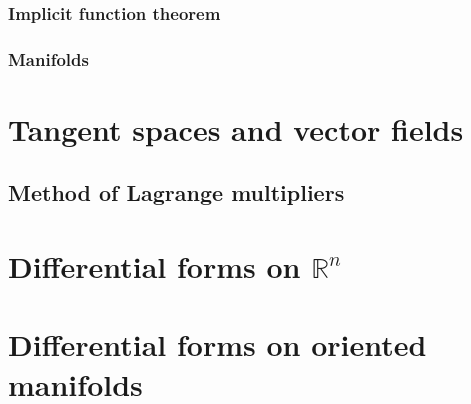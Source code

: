 \documentclass[letter-paper]{tufte-book}
\begin{document}

\subsection{Implicit function theorem}


\subsection{Manifolds}


\chapter{Tangent spaces and vector fields}


\section{Method of Lagrange multipliers}


\chapter{Differential forms on $\mathbb{R}^n$}


\chapter{Differential forms on oriented manifolds}








\mainmatter




%


\end{document}
